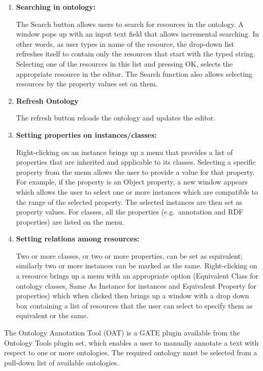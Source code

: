 {\begin{enumerate}
\item \textbf{Searching in ontology:}

The Search button allows users to search for resources in the ontology. A window
pops up with an input text field that allows incremental searching.  In other 
words, as user types in name of the resource, the drop-down list refreshes itself
to contain only the resources that start with the typed string. Selecting one of
the resources in this list and pressing OK, selects the appropriate resource in 
the editor.  The Search function also allows selecting resources by the property
values set on them.

\item \textbf{Refresh Ontology}

The refresh button reloads the ontology and updates the editor.

\item \textbf{Setting properties on instances/classes:}

Right-clicking on an instance brings up a menu that provides a list of properties
that are inherited and applicable to its classes.  Selecting a specific
property from the menu allows the user to provide a value for that property. For
example, if the property is an Object property, a new window appears which
allows the user to select one or more instances which are compatible to the range
of the selected property.  The selected instances are then set as property
values.  For classes, all the properties (e.g.~annotation 
and RDF properties) are listed on the menu.

\item \textbf{Setting relations among resources:}

Two or more classes, or two or more properties, can be set as equivalent;
similarly two or more instances can be marked as the same. Right-clicking on a
resource brings up a menu with an appropriate option (Equivalent Class for
ontology classes, Same As Instance for instances and Equivalent Property for
properties) which when clicked then brings up a window with a drop down box
containing a list of resources that the user can select to specify them as
equivalent or the same.
\end{enumerate}



The Ontology Annotation Tool (OAT) is a GATE plugin available from
the Ontology Tools plugin set, which enables a user to manually annotate a text
with respect to one or more ontologies. The required ontology must be selected
from a pull-down list of available ontologies.

}
